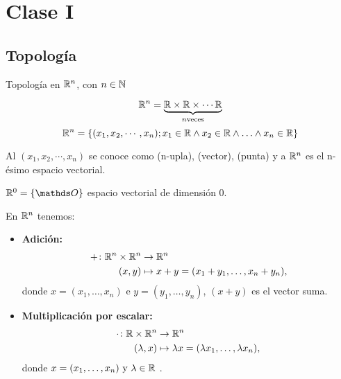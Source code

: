 \chapter{Clase I}

\section{Topología}

Topología en $\mathbb{R}^{n}$, con $n \in \mathbb{N}$

$$
\mathbb{R}^{n} =  \underbrace{\mathbb{R} \times \mathbb{R} \times \cdots \mathbb{R} }_{n \text{veces}}
$$
$$
\mathbb{R}^{n} = \{ (x_1, x_2, \cdots, x_n); x_1 \in \mathbb{R} \wedge  x_2 \in \mathbb{R} \wedge
 \ldots  \wedge  x_n \in \mathbb{R}       \}
$$

Al $(x_1, x_2, \cdots, x_n) $  se conoce como (n-upla), (vector), (punta) y a $\mathbb{R}^{n}$ es el n-ésimo espacio vectorial.

$\Real{0} = \{\Ou\}$  espacio vectorial de dimensión $0$.

En $\mathbb{R}^{n}$ tenemos:

\begin{itemize}
    \item \textbf{Adición:}
    \begin{align*}
        +\colon \mathbb{R}^{n} \times \mathbb{R}^{n} &\to \mathbb{R}^{n} \\
        (x, y) &\mapsto x + y = (x_1 + y_1, \dots, x_n + y_n),
    \end{align*}
    donde $x = (x_1, \dots, x_n)$ e $y = (y_1, \dots, y_n)$, $(x+y)$ es el vector suma.

    \item \textbf{Multiplicación por escalar:}
    \begin{align*}
        \cdot\colon \mathbb{R} \times \mathbb{R}^{n} &\to \mathbb{R}^{n} \\
        (\lambda, x) &\mapsto \lambda x = (\lambda x_1, \dots, \lambda x_n),
    \end{align*}
    donde $x = (x_1, \dots, x_n) \text{ y } \lambda \in \mathbb{R}$ .
\end{itemize}




